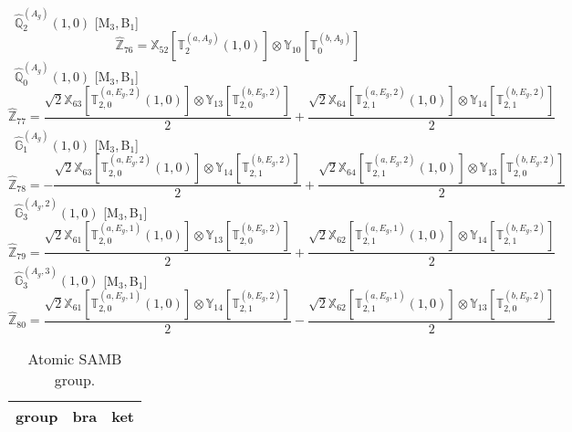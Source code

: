 \documentclass[fleqn,10pt,landscape]{article}
\begin{document}
\begin{itemize}
\noindent {} $\,\,\,\hat{\mathbb{Q}}_{2}^{(A_{g})}(1,0)$ [M$_{3}$,\,B$_{1}$]
\begin{dmath*}
\hat{\mathbb{Z}}_{76}=\mathbb{X}_{52}[\mathbb{T}_{2}^{(a,A_{g})}(1,0)] \otimes\mathbb{Y}_{10}[\mathbb{T}_{0}^{(b,A_{g})}]
\end{dmath*}
\vspace{4mm}
\noindent {} $\,\,\,\hat{\mathbb{Q}}_{0}^{(A_{g})}(1,0)$ [M$_{3}$,\,B$_{1}$]
\begin{dmath*}
\hat{\mathbb{Z}}_{77}=\frac{\sqrt{2} \mathbb{X}_{63}[\mathbb{T}_{2,0}^{(a,E_{g},2)}(1,0)] \otimes\mathbb{Y}_{13}[\mathbb{T}_{2,0}^{(b,E_{g},2)}]}{2} + \frac{\sqrt{2} \mathbb{X}_{64}[\mathbb{T}_{2,1}^{(a,E_{g},2)}(1,0)] \otimes\mathbb{Y}_{14}[\mathbb{T}_{2,1}^{(b,E_{g},2)}]}{2}
\end{dmath*}
\vspace{4mm}
\noindent {} $\,\,\,\hat{\mathbb{G}}_{1}^{(A_{g})}(1,0)$ [M$_{3}$,\,B$_{1}$]
\begin{dmath*}
\hat{\mathbb{Z}}_{78}=- \frac{\sqrt{2} \mathbb{X}_{63}[\mathbb{T}_{2,0}^{(a,E_{g},2)}(1,0)] \otimes\mathbb{Y}_{14}[\mathbb{T}_{2,1}^{(b,E_{g},2)}]}{2} + \frac{\sqrt{2} \mathbb{X}_{64}[\mathbb{T}_{2,1}^{(a,E_{g},2)}(1,0)] \otimes\mathbb{Y}_{13}[\mathbb{T}_{2,0}^{(b,E_{g},2)}]}{2}
\end{dmath*}
\vspace{4mm}
\noindent {} $\,\,\,\hat{\mathbb{G}}_{3}^{(A_{g},2)}(1,0)$ [M$_{3}$,\,B$_{1}$]
\begin{dmath*}
\hat{\mathbb{Z}}_{79}=\frac{\sqrt{2} \mathbb{X}_{61}[\mathbb{T}_{2,0}^{(a,E_{g},1)}(1,0)] \otimes\mathbb{Y}_{13}[\mathbb{T}_{2,0}^{(b,E_{g},2)}]}{2} + \frac{\sqrt{2} \mathbb{X}_{62}[\mathbb{T}_{2,1}^{(a,E_{g},1)}(1,0)] \otimes\mathbb{Y}_{14}[\mathbb{T}_{2,1}^{(b,E_{g},2)}]}{2}
\end{dmath*}
\vspace{4mm}
\noindent {} $\,\,\,\hat{\mathbb{G}}_{3}^{(A_{g},3)}(1,0)$ [M$_{3}$,\,B$_{1}$]
\begin{dmath*}
\hat{\mathbb{Z}}_{80}=\frac{\sqrt{2} \mathbb{X}_{61}[\mathbb{T}_{2,0}^{(a,E_{g},1)}(1,0)] \otimes\mathbb{Y}_{14}[\mathbb{T}_{2,1}^{(b,E_{g},2)}]}{2} - \frac{\sqrt{2} \mathbb{X}_{62}[\mathbb{T}_{2,1}^{(a,E_{g},1)}(1,0)] \otimes\mathbb{Y}_{13}[\mathbb{T}_{2,0}^{(b,E_{g},2)}]}{2}
\end{dmath*}
\begin{center}
\renewcommand{\arraystretch}{1.3}
\begin{longtable}{c|c|c}
\caption{Atomic SAMB group.}
 \\
 \hline \hline
group & bra & ket \\ \hline \endfirsthead


\end{longtable}
\end{center}
\end{itemize}
\end{document}
